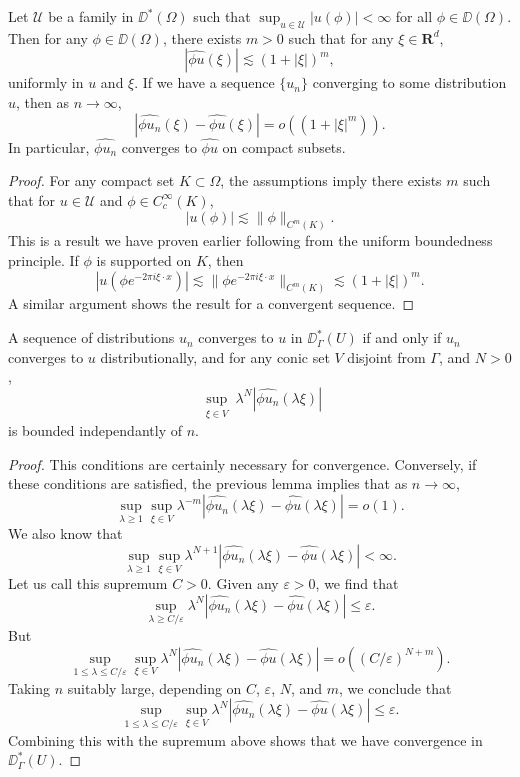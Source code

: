 \begin{lemma}
    Let $\mathcal{U}$ be a family in $\DD^*(\Omega)$ such that $\sup_{u \in \mathcal{U}} |u(\phi)| < \infty$ for all $\phi \in \DD(\Omega)$. Then for any $\phi \in \DD(\Omega)$, there exists $m > 0$ such that for any $\xi \in \mathbf{R}^d$,
    \[ |\widehat{\phi u}(\xi)| \lesssim (1 + |\xi|)^m, \]
    uniformly in $u$ and $\xi$. If we have a sequence $\{ u_n \}$ converging to some distribution $u$, then as $n \to \infty$,
    \[ |\widehat{\phi u_n}(\xi) - \widehat{\phi u}(\xi)| = o((1 + |\xi|^m)). \]
    In particular, $\widehat{\phi u_n}$ converges to $\widehat{\phi u}$ on compact subsets.
\end{lemma}
\begin{proof}
    For any compact set $K \subset \Omega$, the assumptions imply there exists $m$ such that for $u \in \mathcal{U}$ and $\phi \in C_c^\infty(K)$,
    \[ |u(\phi)| \lesssim \| \phi \|_{C^m(K)}. \]
    This is a result we have proven earlier following from the uniform boundedness principle. If $\phi$ is supported on $K$, then
    \[ |u(\phi e^{-2 \pi i \xi \cdot x})| \lesssim \| \phi e^{-2 \pi i \xi \cdot x} \|_{C^m(K)} \lesssim (1 + |\xi|)^m. \]
    A similar argument shows the result for a convergent sequence.
\end{proof}

\begin{theorem}
    A sequence of distributions $u_n$ converges to $u$ in $\DD^*_\Gamma(U)$ if and only if $u_n$ converges to $u$ distributionally, and for any conic set $V$ disjoint from $\Gamma$, and $N > 0$,
    \[ \sup_{\substack{\xi \in V}} \lambda^N |\widehat{\phi u_n}(\lambda \xi)| \]
    is bounded independantly of $n$.
\end{theorem}
\begin{proof}
    This conditions are certainly necessary for convergence. Conversely, if these conditions are satisfied, the previous lemma implies that as $n \to \infty$,
    \[ \sup_{\lambda \geq 1} \sup_{\xi \in V} \lambda^{-m} |\widehat{\phi u_n}(\lambda \xi) - \widehat{\phi u}(\lambda \xi)| = o(1). \]
    We also know that
    \[ \sup_{\lambda \geq 1} \sup_{\xi \in V} \lambda^{N+1} |\widehat{\phi u_n}(\lambda \xi) - \widehat{\phi u}(\lambda \xi)| < \infty. \]
    Let us call this supremum $C > 0$. Given any $\varepsilon > 0$, we find that
    \[ \sup_{\lambda \geq C/\varepsilon} \lambda^N |\widehat{\phi u_n}(\lambda \xi) - \widehat{\phi u}(\lambda \xi)| \leq \varepsilon. \]
    But
    \[ \sup_{1 \leq \lambda \leq C/\varepsilon} \sup_{\xi \in V} \lambda^N |\widehat{\phi u_n}(\lambda \xi) - \widehat{\phi u}(\lambda \xi)| = o((C/\varepsilon)^{N+m}). \]
    Taking $n$ suitably large, depending on $C$, $\varepsilon$, $N$, and $m$, we conclude that
    \[ \sup_{1 \leq \lambda \leq C/\varepsilon} \sup_{\xi \in V} \lambda^N |\widehat{\phi u_n}(\lambda \xi) - \widehat{\phi u}(\lambda \xi)| \leq \varepsilon. \]
    Combining this with the supremum above shows that we have convergence in $\DD^*_\Gamma(U)$.
\end{proof}

